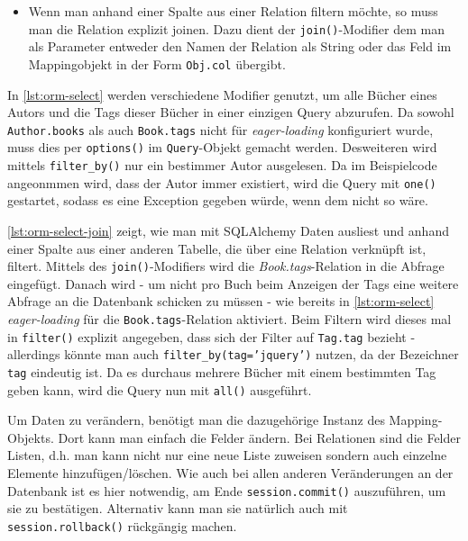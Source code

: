 \begin{itemize}
\item Wenn man anhand einer Spalte aus einer Relation filtern möchte, so muss
man die Relation explizit joinen. Dazu dient der \texttt{join()}-Modifier dem
man als Parameter entweder den Namen der Relation als String oder das Feld im
Mappingobjekt in der Form \texttt{Obj.col} übergibt.

\end{itemize}

In \autoref{lst:orm-select} werden verschiedene Modifier genutzt, um alle Bücher
eines Autors und die Tags dieser Bücher in einer einzigen Query abzurufen. Da
sowohl \texttt{Author.books} als auch \texttt{Book.tags} nicht für
\emph{eager-loading} konfiguriert wurde, muss dies per \texttt{options()} im
\texttt{Query}-Objekt gemacht werden. Desweiteren wird mittels
\texttt{filter\_by()} nur ein bestimmer Autor ausgelesen. Da im Beispielcode
angeonmmen wird, dass der Autor immer existiert, wird die Query mit
\texttt{one()} gestartet, sodass es eine Exception gegeben würde, wenn dem nicht
so wäre.



\autoref{lst:orm-select-join} zeigt, wie man mit SQLAlchemy Daten ausliest und
anhand einer Spalte aus einer anderen Tabelle, die über eine Relation verknüpft
ist, filtert. Mittels des \texttt{join()}-Modifiers wird die
\emph{Book.tags}-Relation in die Abfrage eingefügt. Danach wird - um nicht pro
Buch beim Anzeigen der Tags eine weitere Abfrage an die Datenbank schicken zu
müssen - wie bereits in \autoref{lst:orm-select} \emph{eager-loading} für die
\texttt{Book.tags}-Relation aktiviert. Beim Filtern wird dieses mal in
\texttt{filter()} explizit angegeben, dass sich der Filter auf \texttt{Tag.tag}
bezieht - allerdings könnte man auch \texttt{filter\_by(tag='jquery')} nutzen,
da der Bezeichner \texttt{tag} eindeutig ist. Da es durchaus mehrere Bücher mit
einem bestimmten Tag geben kann, wird die Query nun mit \texttt{all()}
ausgeführt.



Um Daten zu verändern, benötigt man die dazugehörige Instanz des
Mapping-Objekts. Dort kann man einfach die Felder ändern. Bei Relationen sind
die Felder Listen, d.h. man kann nicht nur eine neue Liste zuweisen sondern auch
einzelne Elemente hinzufügen/löschen. Wie auch bei allen anderen Veränderungen
an der Datenbank ist es hier notwendig, am Ende \texttt{session.commit()}
auszuführen, um sie zu bestätigen. Alternativ kann man sie natürlich auch mit
\texttt{session.rollback()} rückgängig machen.

